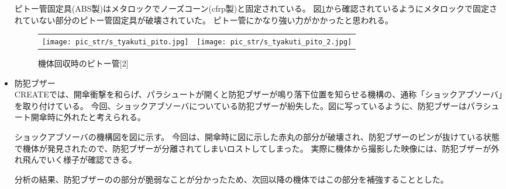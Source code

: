 \documentclass[a4paper,11pt,titlepage,uplatex]{jsarticle}
\begin{document}
\begin{itemize}
    ピトー管固定具(ABS製)はメタロックでノーズコーン(cfrp製)と固定されている。
    図\ref{s_tyakuti_pito2}から確認されているようにメタロックで固定されていない部分のピトー管固定具が破壊されていた。
    ピトー管にかなり強い力がかかったと思われる。
    
    \begin{figure}[H]
        \begin{tabular}{cc}
        \begin{minipage}[t]{0.45\hsize}
        \centering
        \texttt{[image: pic\_str/s\_tyakuti\_pito.jpg]}
        \caption{機体回収時のピトー管[1]}\label{s_tyakuti_pito}
        \end{minipage}&
        \begin{minipage}[t]{0.45\hsize}
        \centering
        \texttt{[image: pic\_str/s\_tyakuti\_pito\_2.jpg]}
        \caption{機体回収時のピトー管[2]}\label{s_tyakuti_pito2}
        \end{minipage}\end{tabular}
    \end{figure}
    
    \item 防犯ブザー\\
    CREATEでは、開傘衝撃を和らげ、パラシュートが開くと防犯ブザーが鳴り落下位置を知らせる機構の、通称「ショックアブソーバ」を取り付けている。
    今回、ショックアブソーバについている防犯ブザーが紛失した。図に写っているように、防犯ブザーはパラシュート開傘時に外れたと考えられる。
    
    ショックアブソーバの機構図を図に示す。
    今回は、開傘時に図に示した赤丸の部分が破壊され、防犯ブザーのピンが抜けている状態で機体が発見されたので、防犯ブザーが分離されてしまいロストしてしまった。
    実際に機体から撮影した映像には、防犯ブザーが外れ飛んでいく様子が確認できる。

    分析の結果、防犯ブザーのの部分が脆弱なことが分かったため、次回以降の機体ではこの部分を補強することとした。


\end{itemize}
\end{document}
